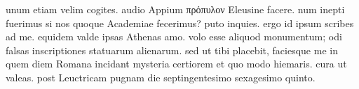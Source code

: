  unum etiam velim cogites. audio Appium πρόπυλον Eleusine facere. num inepti fuerimus si nos quoque Academiae fecerimus? puto inquies. ergo id ipsum scribes ad me. equidem valde ipsas Athenas amo. volo esse aliquod monumentum; odi falsas inscriptiones statuarum alienarum. sed ut tibi placebit, faciesque me in quem diem Romana incidant mysteria certiorem et quo modo hiemaris. cura ut valeas. post Leuctricam pugnam die septingentesimo sexagesimo quinto.
